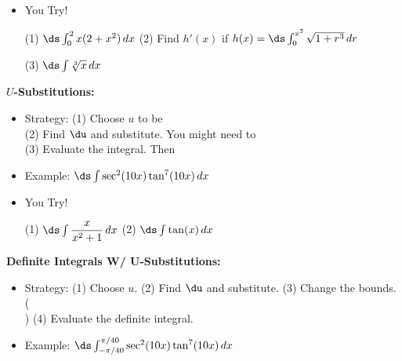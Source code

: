 \documentclass[12pt,letterpaper]{article}
\begin{document}
\begin{itemize}
\item You Try!

(1) $\ds \int_0^2 x(2 + x^2) \, dx$ \hspace{1.5in} (2) Find $h'(x)$ if $h(x) = \ds \int_0^{x^2} \sqrt{1+r^3} \, dr$

\vfill

(3) $\ds\int \sqrt[3]{x} \, dx$

\end{itemize}


\noindent\textbf{$U$-Substitutions:}

\begin{itemize}

\item Strategy: (1) Choose $u$ to be \hrulefill \\
(2) Find $\du$ and substitute. You might need to \hrulefill \\
(3) Evaluate the integral. Then \hrulefill

\item Example: $\ds \int \sec^2(10x)\tan^7(10x) \, dx$

\vfill
\end{itemize}

\begin{itemize}
\item You Try!

(1) $\ds \int \dfrac{x}{x^2 + 1} \, dx$ \hspace{2in} (2) $\ds\int \tan(x) \, dx$

\vfill

\end{itemize}











\newpage


\noindent\textbf{Definite Integrals W/ U-Substitutions:}


\begin{itemize}

\item Strategy: (1) Choose $u$. (2) Find $\du$ and substitute. (3) Change the bounds. (\hrulefill \\
\underline{\hspace{3in}}) (4) Evaluate the definite integral.  


\item Example: $\ds \int_{-\pi/40}^{\pi/40} \sec^2(10x)\tan^7(10x) \, dx$

\vfill
\end{itemize}
\end{document}
